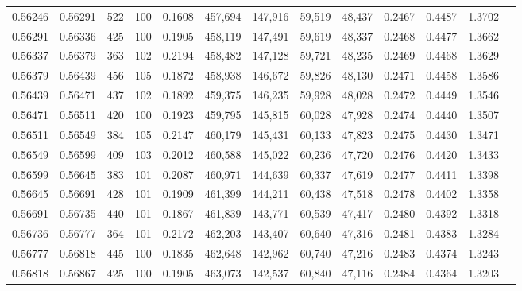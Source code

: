 \begin{tabular}{rrrrrrrrrrrrr}
0.56246 & 0.56291 &   522 & 100 &                                     0.1608 & 457,694 & 147,916 &  59,519 &  48,437 & 0.2467 & 0.4487 & 1.3702 \\
0.56291 & 0.56336 &   425 & 100 &                                     0.1905 & 458,119 & 147,491 &  59,619 &  48,337 & 0.2468 & 0.4477 & 1.3662 \\
0.56337 & 0.56379 &   363 & 102 &                                     0.2194 & 458,482 & 147,128 &  59,721 &  48,235 & 0.2469 & 0.4468 & 1.3629 \\
0.56379 & 0.56439 &   456 & 105 &                                     0.1872 & 458,938 & 146,672 &  59,826 &  48,130 & 0.2471 & 0.4458 & 1.3586 \\
0.56439 & 0.56471 &   437 & 102 &                                     0.1892 & 459,375 & 146,235 &  59,928 &  48,028 & 0.2472 & 0.4449 & 1.3546 \\
0.56471 & 0.56511 &   420 & 100 &                                     0.1923 & 459,795 & 145,815 &  60,028 &  47,928 & 0.2474 & 0.4440 & 1.3507 \\
0.56511 & 0.56549 &   384 & 105 &                                     0.2147 & 460,179 & 145,431 &  60,133 &  47,823 & 0.2475 & 0.4430 & 1.3471 \\
0.56549 & 0.56599 &   409 & 103 &                                     0.2012 & 460,588 & 145,022 &  60,236 &  47,720 & 0.2476 & 0.4420 & 1.3433 \\
0.56599 & 0.56645 &   383 & 101 &                                     0.2087 & 460,971 & 144,639 &  60,337 &  47,619 & 0.2477 & 0.4411 & 1.3398 \\
0.56645 & 0.56691 &   428 & 101 &                                     0.1909 & 461,399 & 144,211 &  60,438 &  47,518 & 0.2478 & 0.4402 & 1.3358 \\
0.56691 & 0.56735 &   440 & 101 &                                     0.1867 & 461,839 & 143,771 &  60,539 &  47,417 & 0.2480 & 0.4392 & 1.3318 \\
0.56736 & 0.56777 &   364 & 101 &                                     0.2172 & 462,203 & 143,407 &  60,640 &  47,316 & 0.2481 & 0.4383 & 1.3284 \\
0.56777 & 0.56818 &   445 & 100 &                                     0.1835 & 462,648 & 142,962 &  60,740 &  47,216 & 0.2483 & 0.4374 & 1.3243 \\
0.56818 & 0.56867 &   425 & 100 &                                     0.1905 & 463,073 & 142,537 &  60,840 &  47,116 & 0.2484 & 0.4364 & 1.3203 \\

\end{tabular}
